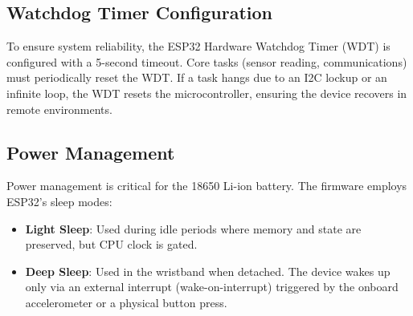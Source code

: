 \subsection{Watchdog Timer Configuration}
To ensure system reliability, the ESP32 Hardware Watchdog Timer (WDT) is configured with a 5-second timeout. Core tasks (sensor reading, communications) must periodically reset the WDT. If a task hangs due to an I2C lockup or an infinite loop, the WDT resets the microcontroller, ensuring the device recovers in remote environments.

\subsection{Power Management}
Power management is critical for the 18650 Li-ion battery. The firmware employs ESP32's sleep modes:
\begin{itemize}
    \item \textbf{Light Sleep}: Used during idle periods where memory and state are preserved, but CPU clock is gated.
    \item \textbf{Deep Sleep}: Used in the wristband when detached. The device wakes up only via an external interrupt (wake-on-interrupt) triggered by the onboard accelerometer or a physical button press.
\end{itemize}

